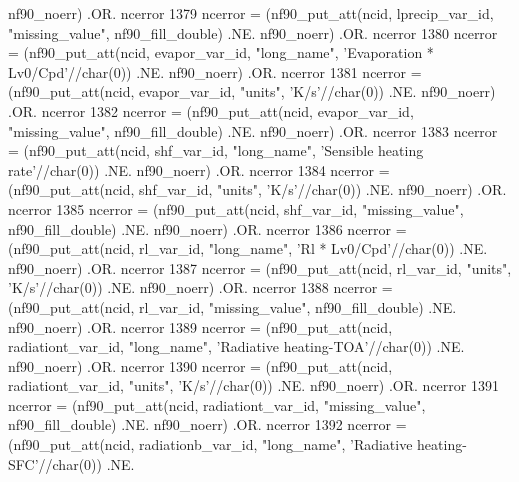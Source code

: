 \begin{DoxyCode}
      nf90\_noerr) .OR. ncerror
1379     ncerror = (nf90\_put\_att(ncid, lprecip\_var\_id, \textcolor{stringliteral}{"missing\_value"}, nf90\_fill\_double)                .NE. 
      nf90\_noerr) .OR. ncerror
1380     ncerror = (nf90\_put\_att(ncid, evapor\_var\_id, \textcolor{stringliteral}{"long\_name"}, \textcolor{stringliteral}{'Evaporation * Lv0/Cpd'}//char(0))     .NE. 
      nf90\_noerr) .OR. ncerror
1381     ncerror = (nf90\_put\_att(ncid, evapor\_var\_id, \textcolor{stringliteral}{"units"}, \textcolor{stringliteral}{'K/s'}//char(0))                           .NE. 
      nf90\_noerr) .OR. ncerror
1382     ncerror = (nf90\_put\_att(ncid, evapor\_var\_id, \textcolor{stringliteral}{"missing\_value"}, nf90\_fill\_double)                 .NE. 
      nf90\_noerr) .OR. ncerror
1383     ncerror = (nf90\_put\_att(ncid, shf\_var\_id, \textcolor{stringliteral}{"long\_name"}, \textcolor{stringliteral}{'Sensible heating rate'}//char(0))        .NE. 
      nf90\_noerr) .OR. ncerror
1384     ncerror = (nf90\_put\_att(ncid, shf\_var\_id, \textcolor{stringliteral}{"units"}, \textcolor{stringliteral}{'K/s'}//char(0))                              .NE. 
      nf90\_noerr) .OR. ncerror
1385     ncerror = (nf90\_put\_att(ncid, shf\_var\_id, \textcolor{stringliteral}{"missing\_value"}, nf90\_fill\_double)                    .NE. 
      nf90\_noerr) .OR. ncerror
1386     ncerror = (nf90\_put\_att(ncid, rl\_var\_id, \textcolor{stringliteral}{"long\_name"}, \textcolor{stringliteral}{'Rl * Lv0/Cpd'}//char(0))                  .NE. 
      nf90\_noerr) .OR. ncerror
1387     ncerror = (nf90\_put\_att(ncid, rl\_var\_id, \textcolor{stringliteral}{"units"}, \textcolor{stringliteral}{'K/s'}//char(0))                               .NE. 
      nf90\_noerr) .OR. ncerror
1388     ncerror = (nf90\_put\_att(ncid, rl\_var\_id, \textcolor{stringliteral}{"missing\_value"}, nf90\_fill\_double)                     .NE. 
      nf90\_noerr) .OR. ncerror
1389     ncerror = (nf90\_put\_att(ncid, radiationt\_var\_id, \textcolor{stringliteral}{"long\_name"}, \textcolor{stringliteral}{'Radiative heating-TOA'}//char(0)) .NE. 
      nf90\_noerr) .OR. ncerror
1390     ncerror = (nf90\_put\_att(ncid, radiationt\_var\_id, \textcolor{stringliteral}{"units"}, \textcolor{stringliteral}{'K/s'}//char(0))                       .NE. 
      nf90\_noerr) .OR. ncerror
1391     ncerror = (nf90\_put\_att(ncid, radiationt\_var\_id, \textcolor{stringliteral}{"missing\_value"}, nf90\_fill\_double)             .NE. 
      nf90\_noerr) .OR. ncerror
1392     ncerror = (nf90\_put\_att(ncid, radiationb\_var\_id, \textcolor{stringliteral}{"long\_name"}, \textcolor{stringliteral}{'Radiative heating-SFC'}//char(0)) .NE. 

\end{DoxyCode}
